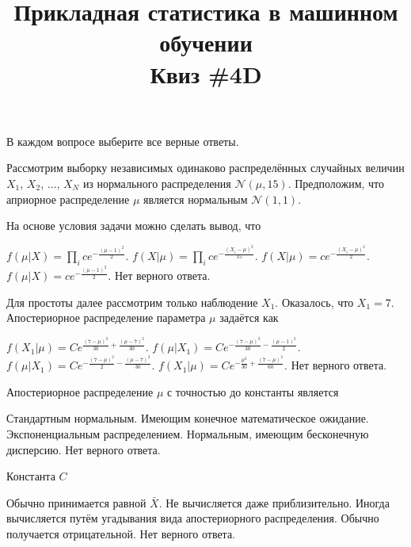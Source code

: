 \documentclass[10pt, a4paper]{exam}
\title{{\normalsize Прикладная статистика в машинном обучении} \\ \vspace{0.5em} Квиз \#4D}
\author{\rule{15cm}{0.4pt}}
\begin{document}
	
	\maketitle
	
	\begin{center}
		В каждом вопросе выберите все верные ответы.
	\end{center}
	
	Рассмотрим выборку независимых одинаково распределённых случайных величин $X_1$, $X_2$, $\ldots$, $X_N$ из нормального распределения $\mathcal{N}(\mu, 15)$. Предположим, что априорное распределение $\mu$ является нормальным $\mathcal{N}(1, 1)$.
	
	\begin{questions}
		\question На основе условия задачи можно сделать вывод, что
		\begin{choices} 
			\choice $f(\mu | X) = \prod_i ce^{-\frac{(\mu - 1)^2}{2}}$.
			\choice $f(X | \mu) = \prod_i ce^{-\frac{(X_i - \mu)^2}{15}}$.
			\choice $f(X | \mu) =  ce^{-\frac{(X_i - \mu)^2}{2}}$.
			\choice $f(\mu | X) = ce^{-\frac{(\mu - 1)^2}{2}}$.
			\choice Нет верного ответа.
		\end{choices}
	
		\question Для простоты далее рассмотрим только наблюдение $X_1$. Оказалось, что $X_1 = 7$. Апостериорное распределение параметра $\mu$ задаётся как
		\begin{choices}
			\choice $f( X_{1} | \mu) = Ce^{\frac{(7 - \mu)^2}{30} + \frac{(\mu - 7)^2}{30}}$.
			\choice $f(\mu | X_{1}) = Ce^{-\frac{(7 - \mu)^2}{30} - \frac{(\mu - 1)^2}{2}}$.
			\choice $f(\mu | X_{1}) = Ce^{-\frac{(7 - \mu)^2}{2} - \frac{(\mu - 7)^2}{30}}$.
			\choice $f(X_1 | \mu) = Ce^{-\frac{\mu^2}{30} + \frac{(7 - \mu)^2}{60}}$.
			\choice Нет верного ответа.
		\end{choices}
	
		\question Апостериорное распределение $\mu$ с точностью до константы является 
		\begin{choices}
			\choice Стандартным нормальным.
			\choice Имеющим конечное математическое ожидание.
			\choice Экспоненциальным распределением.
			\choice Нормальным, имеющим бесконечную дисперсию.
			\choice Нет верного ответа.
		\end{choices}
		
		\question Константа $C$
		\begin{choices}
			\choice Обычно принимается равной $\bar{X}$.
			\choice Не вычисляется даже приблизительно.
			\choice Иногда вычисляется путём угадывания вида апостериорного распределения.
			\choice Обычно получается отрицательной.
			\choice Нет верного ответа.
		\end{choices}
	

\end{questions}
\end{document}
